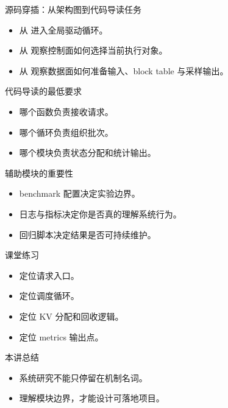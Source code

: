 \begin{frame}{源码穿插：从架构图到代码导读任务}
  \begin{itemize}
    \item 从 \texttt{} 进入全局驱动循环。
    \item 从 \texttt{} 观察控制面如何选择当前执行对象。
    \item 从 \texttt{} 观察数据面如何准备输入、block table 与采样输出。
  \end{itemize}
\end{frame}

\begin{frame}{代码导读的最低要求}
  \begin{itemize}
    \item 哪个函数负责接收请求。
    \item 哪个循环负责组织批次。
    \item 哪个模块负责状态分配和统计输出。
  \end{itemize}
\end{frame}

\begin{frame}{辅助模块的重要性}
  \begin{itemize}
    \item benchmark 配置决定实验边界。
    \item 日志与指标决定你是否真的理解系统行为。
    \item 回归脚本决定结果是否可持续维护。
  \end{itemize}
\end{frame}

\begin{frame}{课堂练习}
  \begin{itemize}
    \item 定位请求入口。
    \item 定位调度循环。
    \item 定位 KV 分配和回收逻辑。
    \item 定位 metrics 输出点。
  \end{itemize}
\end{frame}



\begin{frame}{本讲总结}
  \begin{itemize}
    \item 系统研究不能只停留在机制名词。
    \item 理解模块边界，才能设计可落地项目。
  \end{itemize}
\end{frame}

